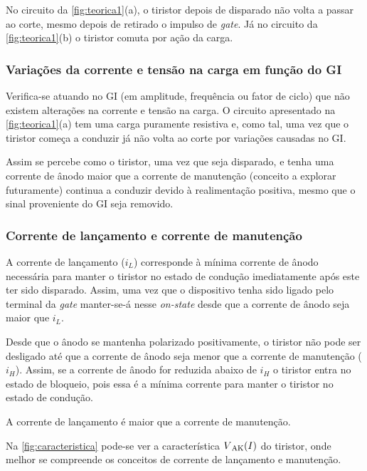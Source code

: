 \documentclass[a4paper,11pt]{article}
\numberwithin{equation}{section}
\begin{document}
No circuito da \autoref{fig:teorica1}(a), o tiristor depois de disparado não volta a passar ao corte, mesmo depois de retirado o impulso de \textit{gate}. Já no circuito da \autoref{fig:teorica1}(b) o tiristor comuta por ação da carga.


\subsubsection{Variações da corrente e tensão na carga em função do GI}

Verifica-se atuando no GI (em amplitude, frequência ou fator de ciclo) que não existem alterações na corrente e tensão na carga. O circuito apresentado na \autoref{fig:teorica1}(a) tem uma carga puramente resistiva e, como tal, uma vez que o tiristor começa a conduzir já não volta ao corte por variações causadas no GI.

Assim se percebe como o tiristor, uma vez que seja disparado, e tenha uma corrente de ânodo maior que a corrente de manutenção (conceito a explorar futuramente) continua a conduzir devido à realimentação positiva, mesmo que o sinal proveniente do GI seja removido. 


\subsubsection{Corrente de lançamento e corrente de manutenção}


A corrente de lançamento ($i_L$) corresponde à mínima corrente de ânodo necessária para manter o tiristor no estado de condução imediatamente após este ter sido disparado. Assim, uma vez que o dispositivo tenha sido ligado pelo terminal da \textit{gate} manter-se-á nesse \textit{on-state} desde que a corrente de ânodo seja maior que $i_L$.

Desde que o ânodo se mantenha polarizado positivamente, o tiristor não pode ser desligado até que a corrente de ânodo seja menor que a corrente de manutenção ($i_H$). Assim, se a corrente de ânodo for reduzida abaixo de $i_H$ o tiristor entra no estado de bloqueio, pois essa é a mínima corrente para manter o tiristor no estado de condução.

A corrente de lançamento é maior que a corrente de manutenção.

Na \autoref{fig:caracteristica} pode-se ver a característica $V\textsubscript{AK}(I)$ do tiristor, onde melhor se compreende os conceitos de corrente de lançamento e manutenção.
\end{document}
